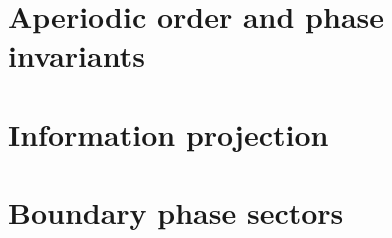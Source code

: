 \part{Aperiodic order and phase invariants}




\part{Information projection}


\part{Boundary phase sectors}

